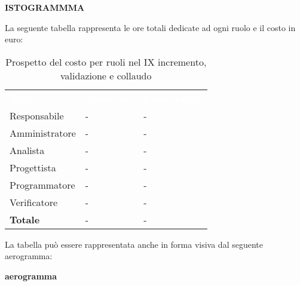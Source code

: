 \textbf{ISTOGRAMMMA}


La seguente tabella rappresenta le ore totali dedicate ad ogni ruolo e il costo in euro:

\begin{table}[!htbp]
\begin{center}
\renewcommand{\arraystretch}{1.5}
\begin{tabular}{ m{}<{\centering}  m{}<{\centering} m{}<{\centering}}
	\rowcolor{darkblue}
	\textcolor{white}{\textbf{Ruolo}}&\textcolor{white}{\textbf{Totale ore}}&\textcolor{white}{\textbf{Costo totale}}\\ 

	Responsabile  & - & - \\	

	\rowcolor{gray!10} Amministratore & - & - \\
	
	Analista & - & - \\
	
	\rowcolor{gray!10} Progettista & - & - \\
	
	Programmatore & - & - \\
	
	\rowcolor{gray!10} Verificatore & - & - \\
	
	\textbf{Totale} & - & - \\
	
\end{tabular}
\caption{Prospetto del costo per ruoli nel IX incremento,  validazione e collaudo}
\end{center}
\end{table}

La tabella può essere rappresentata anche in forma visiva dal seguente aerogramma:

\textbf{aerogramma}

